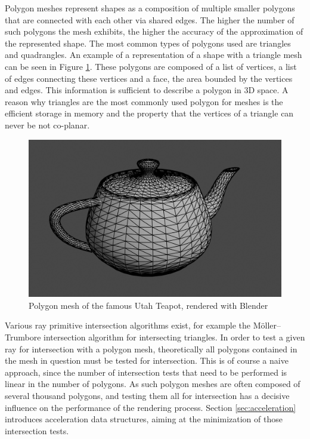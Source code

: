 Polygon meshes represent shapes as a composition of multiple smaller polygons that are connected with each other via shared edges. The higher the number of such polygons the mesh exhibits, the higher the accuracy of the approximation of the represented shape. The most common types of polygons used are triangles and quadrangles. An example of a representation of a shape with a triangle mesh can be seen in Figure \ref{fig:poly_mesh}. These polygons are composed of a list of vertices, a list of edges connecting these vertices and a face, the area bounded by the vertices and edges. This information is sufficient to describe a polygon in 3D space. A reason why triangles are the most commonly used polygon for meshes is the efficient storage in memory and the property that the vertices of a triangle can never be not co-planar.

\begin{figure}
	\centering
	\includegraphics[width=.8\linewidth]{img/1 fundamentals/poly_mesh.png}
	\caption{Polygon mesh of the famous Utah Teapot, rendered with Blender \cite{blender2018}}
	\label{fig:poly_mesh}
\end{figure}

Various ray primitive intersection algorithms exist, for example the Möller– Trumbore intersection algorithm \cite{moller1997fast} for intersecting triangles. In order to test a given ray for intersection with a polygon mesh, theoretically all polygons contained in the mesh in question must be tested for intersection. This is of course a naive approach, since the number of intersection tests that need to be performed is linear in the number of polygons. As such polygon meshes are often composed of several thousand polygons, and testing them all for intersection has a decisive influence on the performance of the rendering process. Section \ref{sec:acceleration} introduces acceleration data structures, aiming at the minimization of those intersection tests.

